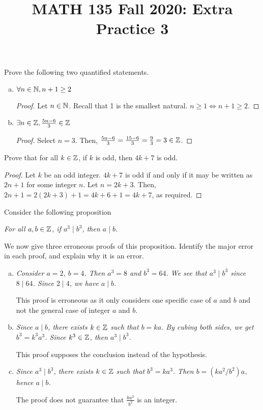 \documentclass[11pt]{article}
\title{MATH 135 Fall 2020: Extra Practice 3}
\begin{document}
\parindent=0pt
\thispagestyle{firstpage}

\textbf{\@title}


\question Prove the following two quantified statements.
\begin{enumerate}[(a)]
    \item $\forall n \in \mathbb{N}, n+1 \geq 2$
    \begin{proof}
        Let $n \in \mathbb{N}$.
        Recall that 1 is the smallest natural.
        $n \geq 1 \iff n+1 \geq 2$.
    \end{proof}
    
    \item $\exists n \in \mathbb{Z}, \frac{5n-6}{3} \in \mathbb{Z}$
    \begin{proof}
        Select $n=3$. Then, $\frac{5n-6}{3}=\frac{15-6}{3}=\frac{9}{3}=3 \in \mathbb{Z}$.
    \end{proof}
\end{enumerate}


\question Prove that for all $k \in \mathbb{Z}$, if $k$ is odd, then $4k + 7$ is odd.
\begin{proof}
    Let $k$ be an odd integer.
    $4k+7$ is odd if and only if it may be written as $2n+1$ for some integer $n$.
    Let $n=2k+3$.
    Then, $2n+1=2(2k+3)+1=4k+6+1=4k+7$, as required.
\end{proof}


\question Consider the following proposition
\begin{center}
    \emph{For all $a,b\in\mathbb{Z}$, if $a^3 \mid b^3$, then $a \mid b$.}
\end{center}
We now give three erroneous proofs of this proposition. Identify the major error in each proof, and explain why it is an error.
\begin{enumerate}[(a)]
    \item \emph{Consider $a = 2$, $b = 4$. Then $a^3 = 8$ and $b^3 = 64$. We see that $a^3 \mid b^3$ since $8 \mid 64$. Since $2 \mid 4$, we have $a \mid b$.}
    
    This proof is erroneous as it only considers one specific case of $a$ and $b$ and not the general case of integer $a$ and $b$.
    
    \item \emph{Since $a \mid b$, there exists $k\in\mathbb{Z}$ such that $b=ka$. By cubing both sides, we get $b^3 = k^3a^3$. Since $k^3\in\mathbb{Z}$, then $a^3\mid b^3$.}
    
    This proof supposes the conclusion instead of the hypothesis.
    
    \item \emph{Since $a^3 \mid b^3$, there exists $k\in\mathbb{Z}$ such that $b^3=ka^3$. Then $b=(ka^2/b^2)a$, hence $a \mid b$.}
    
    The proof does not guarantee that $\frac{ka^2}{b^2}$ is an integer.
\end{enumerate}
\end{document}
